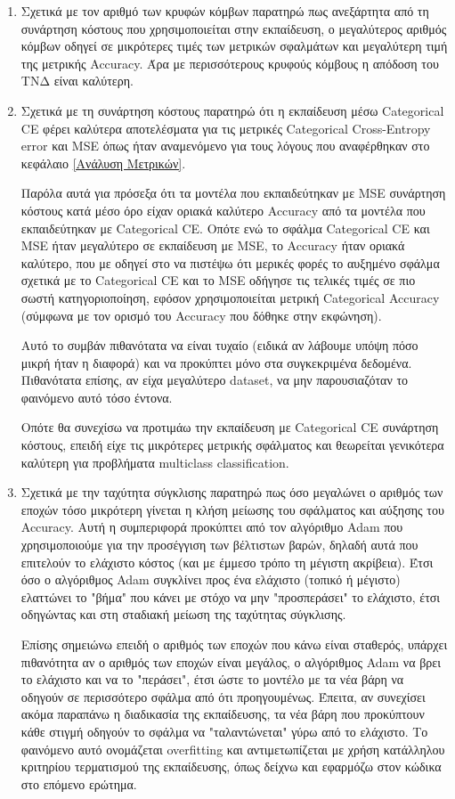 \documentclass[12pt,a4paper]{article}
\begin{document}
\begin{enumerate}
    \item Σχετικά με τον αριθμό των κρυφών κόμβων παρατηρώ πως ανεξάρτητα από τη συνάρτηση κόστους που χρησιμοποιείται στην εκπαίδευση, ο μεγαλύτερος αριθμός κόμβων οδηγεί σε μικρότερες τιμές των μετρικών σφαλμάτων και μεγαλύτερη τιμή της μετρικής Accuracy. Άρα με περισσότερους κρυφούς κόμβους η απόδοση του ΤΝΔ είναι καλύτερη.
    \item Σχετικά με τη συνάρτηση κόστους παρατηρώ ότι η εκπαίδευση μέσω Categorical CE φέρει καλύτερα αποτελέσματα για τις μετρικές Categorical Cross-Entropy error και MSE όπως ήταν αναμενόμενο για τους λόγους που αναφέρθηκαν στο κεφάλαιο \ref{Ανάλυση Μετρικών}. 

        Παρόλα αυτά για πρόσεξα ότι τα μοντέλα που εκπαιδεύτηκαν με MSE συνάρτηση κόστους κατά μέσο όρο είχαν οριακά καλύτερο Accuracy από τα μοντέλα που εκπαιδεύτηκαν με Categorical CE. Οπότε ενώ το σφάλμα Categorical CE και MSE ήταν μεγαλύτερο σε εκπαίδευση με MSE, το Accuracy ήταν οριακά καλύτερο, που με οδηγεί στο να πιστέψω ότι μερικές φορές το αυξημένο σφάλμα σχετικά με το Categorical CE και το MSE οδήγησε τις τελικές τιμές σε πιο σωστή κατηγοριοποίηση, εφόσον χρησιμοποιείται μετρική Categorical Accuracy (σύμφωνα με τον ορισμό του Accuracy που δόθηκε στην εκφώνηση). 

        Αυτό το συμβάν πιθανότατα να είναι τυχαίο (ειδικά αν λάβουμε υπόψη πόσο μικρή ήταν η διαφορά) και να προκύπτει μόνο στα συγκεκριμένα δεδομένα. Πιθανότατα επίσης, αν είχα μεγαλύτερο dataset, να μην παρουσιαζόταν το φαινόμενο αυτό τόσο έντονα.

        Οπότε θα συνεχίσω να προτιμάω την εκπαίδευση με Categorical CE συνάρτηση κόστους, επειδή είχε τις μικρότερες μετρικής σφάλματος και θεωρείται γενικότερα καλύτερη για προβλήματα multiclass classification.
    \item Σχετικά με την ταχύτητα σύγκλισης παρατηρώ πως όσο μεγαλώνει ο αριθμός των εποχών τόσο μικρότερη γίνεται η κλήση μείωσης του σφάλματος και αύξησης του Accuracy. Αυτή η συμπεριφορά προκύπτει από τον αλγόριθμο Adam που χρησιμοποιούμε για την προσέγγιση των βέλτιστων βαρών, δηλαδή αυτά που επιτελούν το ελάχιστο κόστος (και με έμμεσο τρόπο τη μέγιστη ακρίβεια). Έτσι όσο ο αλγόριθμος Adam συγκλίνει προς ένα ελάχιστο (τοπικό ή μέγιστο) ελαττώνει το "βήμα" που κάνει με στόχο να μην "προσπεράσει" το ελάχιστο, έτσι οδηγώντας και στη σταδιακή μείωση της ταχύτητας σύγκλισης.

        Επίσης σημειώνω επειδή ο αριθμός των εποχών που κάνω είναι σταθερός, υπάρχει πιθανότητα αν ο αριθμός των εποχών είναι μεγάλος, ο αλγόριθμος Adam να βρει το ελάχιστο και να το "περάσει", έτσι ώστε το μοντέλο με τα νέα βάρη να οδηγούν σε περισσότερο σφάλμα από ότι προηγουμένως. Έπειτα, αν συνεχίσει ακόμα παραπάνω η διαδικασία της εκπαίδευσης, τα νέα βάρη που προκύπτουν κάθε στιγμή οδηγούν το σφάλμα να "ταλαντώνεται" γύρω από το ελάχιστο. Το φαινόμενο αυτό ονομάζεται overfitting και αντιμετωπίζεται με χρήση κατάλληλου κριτηρίου τερματισμού της εκπαίδευσης, όπως δείχνω και εφαρμόζω στον κώδικα στο επόμενο ερώτημα.
        
\end{enumerate}
\end{document}
